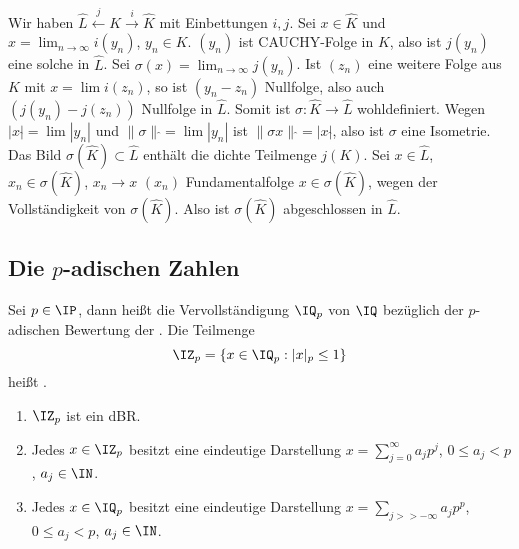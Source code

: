\begin{Beweis}
\begin{enumerate}
Wir haben $\hat L \overset{j}{\leftarrow} K \overset{i}{\rightarrow} \hat K$ mit Einbettungen $i,j$.
Sei $x\in \hat K$ und $x=\lim_{n\rightarrow \infty} i(y_n)$, $y_n\in K$. $(y_n)$ ist CAUCHY-Folge in $K$, also ist $j(y_n)$ eine solche in $\hat L$. Sei $\sigma(x)=\lim_{n\rightarrow\infty}j(y_n)$. Ist $(z_n)$ eine weitere Folge aus $K$ mit $x=\lim i(z_n)$, so ist $(y_n-z_n)$ Nullfolge, also auch $(j(y_n)-j(z_n))$ Nullfolge in $\hat L$. Somit ist $\sigma:\hat K\rightarrow\hat L$ wohldefiniert. Wegen $|x|\hat{}=\lim |y_n|$ und $\|\sigma\|\hat{}=\lim |y_n|$ ist $\|\sigma x\|\hat{}=|x|\hat{}$, also ist $\sigma$ eine Isometrie. Das Bild $\sigma(\hat K)\subset \hat L$ enthält die dichte Teilmenge $j(K)$. Sei $x\in \hat L$, $x_n\in\sigma(\hat K)$, $x_n\rightarrow x$ \folge $(x_n)$ Fundamentalfolge \folge $x\in\sigma(\hat K)$, wegen der Vollständigkeit von $\sigma(\hat K)$. Also ist $\sigma(\hat K)$ abgeschlossen in $\hat L$.
 \end{enumerate}
 \end{Beweis}
 
 \subsection{Die $p$-adischen Zahlen}
 
 \begin{Definition}
  Sei $p\in\IP$, dann heißt die Vervollständigung $\IQ_p$ von $\IQ$ bezüglich der $p$-adischen Bewertung der . Die Teilmenge
  \[\IZ_p=\{ x\in\IQ_p : |x|_p\leq 1\} \]
  heißt .
 \end{Definition}
 
 \begin{Fakt}
  \begin{enumerate}
   \item $\IZ_p$ ist ein dBR.
   \item Jedes $x\in\IZ_p$ besitzt eine eindeutige Darstellung $x=\sum_{j=0}^{\infty} a_jp^j$, $0\leq a_j<p$, $a_j\in\IN$.
   \item Jedes $x\in\IQ_p$ besitzt eine eindeutige Darstellung $x=\sum_{j>>-\infty} a_jp^p$, $0\leq a_j<p$, $a_j\in\IN$.
  \end{enumerate}
 \end{Fakt}
 
